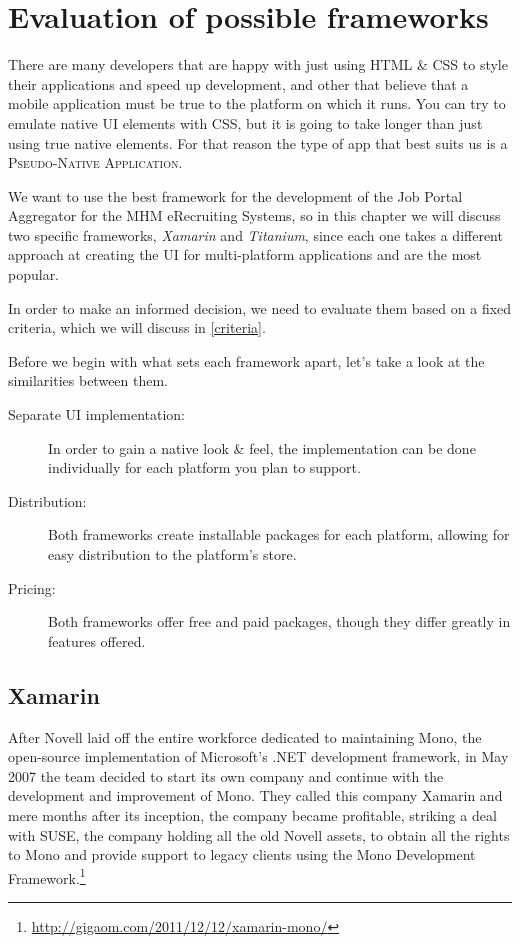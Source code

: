 \chapter{Evaluation of possible frameworks}\label{ch:evaluation}

There are many developers that are happy with just using HTML \& CSS to style their applications and speed up development, and other that believe that a mobile application must be true to the platform on which it runs. You can try to emulate native \ac{UI} elements with CSS, but it is going to take longer than just using true native elements. For that reason the type of app that best suits us is a \textsc{Pseudo-Native Application}. 

We want to use the best framework for the development of the Job Portal Aggregator for the MHM eRecruiting Systems, so in this chapter we will discuss two specific frameworks, \emph{Xamarin} and \emph{Titanium}, since each one takes a different approach at creating the \ac{UI} for multi-platform applications and are the most popular.

In order to make an informed decision, we need to evaluate them based on a fixed criteria, which we will discuss in \autoref{criteria}.

 

Before we begin with what sets each framework apart, let's take a look at the similarities between them.

\begin{description}
\item[Separate UI implementation:] In order to gain a native look \& feel, the implementation can be done individually for each platform you plan to support.
\item[Distribution:] Both frameworks create installable packages for each platform, allowing for easy distribution to the platform's store.
\item[Pricing:] Both frameworks offer free and paid packages, though they differ greatly in features offered.   
\end{description}


\section{Xamarin}
After Novell laid off the entire workforce dedicated to maintaining Mono, the open-source implementation of Microsoft's .NET development framework, in May 2007 the team decided to start its own company and continue with the development and improvement of Mono. They called this company Xamarin and mere months after its inception, the company became profitable, striking a deal with SUSE, the company holding all the old Novell assets, to obtain all the rights to Mono and provide support to legacy clients using the Mono Development Framework.\footnote{\url{http://gigaom.com/2011/12/12/xamarin-mono/}}

